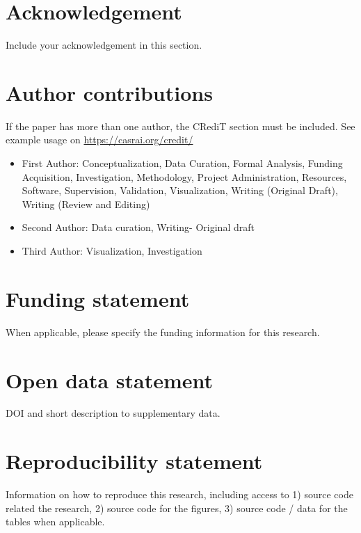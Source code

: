 \documentclass[
  manuscript=article,  %
  layout=preprint,  %
  year=20xx,
  volume=x,
]{extra/joas}
\begin{document}
\section*{Acknowledgement}
Include your acknowledgement in this section.

\section*{Author contributions}
  If the paper has more than one author, the CRediT section must be included. See example usage on \url{https://casrai.org/credit/}

  \begin{itemize}
    \item First Author: Conceptualization, Data Curation, Formal Analysis, Funding Acquisition, Investigation, Methodology, Project Administration, Resources, Software, Supervision, Validation, Visualization, Writing (Original Draft), Writing (Review and Editing)
    \item Second Author: Data curation, Writing- Original draft
    \item Third Author: Visualization, Investigation
  \end{itemize}


\section*{Funding statement}
When applicable, please specify the funding information for this research.


\section*{Open data statement}
DOI and short description to supplementary data.

\section*{Reproducibility statement}
Information on how to reproduce this research, including access to 1) source code related the research, 2) source code for the figures, 3) source code / data for the tables when applicable.



\printbibliography
\end{document}
